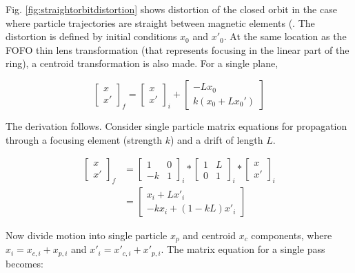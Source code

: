 Fig. \ref{fig:straightorbitdistortion} shows distortion of the closed orbit in the case where particle trajectories are straight between magnetic elements (. The distortion is defined by initial conditions $x_0$ and $x'_0$. At the same location as the FOFO thin lens transformation (that represents focusing in the linear part of the ring), a centroid transformation is also made. For a single plane,

\begin{equation}
\begin{bmatrix} x \\ x' \end{bmatrix}_f = \begin{bmatrix} x \\ x' \end{bmatrix}_i + \begin{bmatrix} -L x_0 \\ k(x_0 + Lx_0') \end{bmatrix}
\label{eq:straightorbitdistortion}
\end{equation}

The derivation follows. Consider single particle matrix equations for propagation through a focusing element (strength $k$) and a drift of length $L$. 

\begin{equation}
\begin{split}
\begin{bmatrix} x \\ x' \end{bmatrix}_f 
& = \begin{bmatrix} 1&0 \\ -k&1 \end{bmatrix}_i \ast \begin{bmatrix} 1&L \\ 0&1 \end{bmatrix}_i \ast \begin{bmatrix} x \\ x' \end{bmatrix}_i \\
& = \begin{bmatrix} x_i + Lx'_i \\ -kx_i + (1-kL)x'_i \end{bmatrix}
\end{split}
\end{equation}

Now divide motion into single particle $x_p$ and centroid $x_c$ components, where $x_i = x_{c,i} + x_{p,i}$ and $x'_i = x'_{c,i} + x'_{p,i}$. The matrix equation for a single pass becomes:

